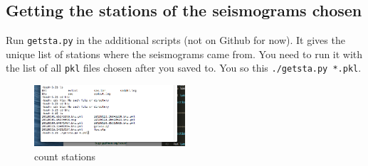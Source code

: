 \documentclass[letterpaper,10pt]{article}
\begin{document}
\subsection{Getting the stations of the seismograms chosen}

Run \verb"getsta.py" in the additional scripts (not on Github for now). It gives the unique list of stations where the seismograms came from. You need to run it with the list of all \verb"pkl" files chosen after you saved to. You so this \verb"./getsta.py *.pkl". 

\begin{figure}[h!]
  \centering
  \includegraphics[width=0.5\textwidth]{images/count_stations}
  \caption{count stations}
  \label{fig:count_stations}
\end{figure}
\end{document}
